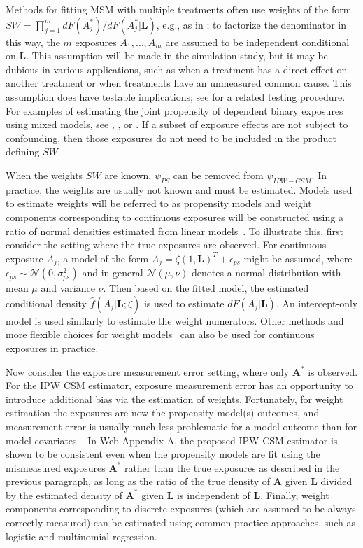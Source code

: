 \documentclass[useAMS,usenatbib,referee]{biom}
\begin{document}
Methods for fitting MSM with multiple treatments often use weights of the form $SW = \prod_{j=1}^{m} dF(A^{*}_{j}) / dF(A^{*}_{j} | \bm{L})$, e.g., as in \citet{hernan2001}; to factorize the denominator in this way, the $m$ exposures $A_{1}, \ldots, A_{m}$ are assumed to be independent conditional on $\bm{L}$. This assumption will be made in the simulation study, but it may be dubious in various applications, such as when a treatment has a direct effect on another treatment or when treatments have an unmeasured common cause. This assumption does have testable implications; see \citet{zhang2012} for a related testing procedure. For examples of estimating the joint propensity of dependent binary exposures using mixed models, see \citet{tchetgen2012}, \citet{perez2014}, or \citet*{liu2016}. If a subset of exposure effects are not subject to confounding, then those exposures do not need to be included in the product defining $SW$.

When the weights $SW$ are known, $\psi_{PS}$ can be removed from $\psi_{IPW-CSM}$. In practice, the weights are usually not known and must be estimated. Models used to estimate weights will be referred to as propensity models and weight components corresponding to continuous exposures will be constructed using a ratio of normal densities estimated from linear models~\citep{hirano2004}. To illustrate this, first consider the setting where the true exposures are observed. For continuous exposure $A_{j}$, a model of the form $A_{j} = \zeta (1, \bm{L})^{T} + \epsilon_{ps}$ might be assumed, where $\epsilon_{ps} \sim \mathcal{N}(0, \sigma^{2}_{ps})$ and in general $\mathcal{N}(\mu, \nu)$ denotes a normal distribution with mean $\mu$ and variance $\nu$. Then based on the fitted model, the estimated conditional density $\hat{f}(A_{j} | \bm{L}; \hat{\zeta})$ is used to estimate $dF(A_{j} | \bm{L})$. An intercept-only model is used similarly to estimate the weight numerators. Other methods and more flexible choices for weight models~\citep{naimi2014} can also be used for continuous exposures in practice.

Now consider the exposure measurement error setting, where only $\bm{A}^{*}$ is observed. For the IPW CSM estimator, exposure measurement error has an opportunity to introduce additional bias via the estimation of weights. Fortunately, for weight estimation the exposures are now the propensity model(s) outcomes, and measurement error is usually much less problematic for a model outcome than for model covariates~\citep{carroll2006}. In Web Appendix A, the proposed IPW CSM estimator is shown to be consistent even when the propensity models are fit using the mismeasured exposures $\bm{A}^{*}$ rather than the true exposures as described in the previous paragraph, as long as the ratio of the true density of $\bm{A}$ given $\bm{L}$ divided by the estimated density of $\bm{A}^{*}$ given $\bm{L}$ is independent of $\bm{L}$. Finally, weight components corresponding to discrete exposures (which are assumed to be always correctly measured) can be estimated using common practice approaches, such as logistic and multinomial regression.
\end{document}
